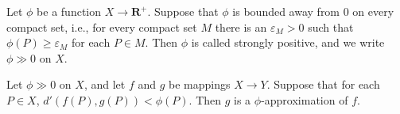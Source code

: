 Let $\phi$ be a function $X \rightarrow \mathbf{R}^+$. Suppose that $\phi$ is bounded away from 0 on every compact set, i.e., for every compact set $M$ there is an $\varepsilon_M > 0$ such that $\phi(P) \geqslant \varepsilon_M$ for each $P \in M$. Then $\phi$ is called strongly positive, and we write $\phi \gg 0$ on $X$.

Let $\phi \gg 0$ on $X$, and let $f$ and $g$ be mappings $X \rightarrow Y$. Suppose that for each $P \in X$, $d'(f(P), g(P)) < \phi(P)$. Then $g$ is a $\phi$-approximation of $f$.
